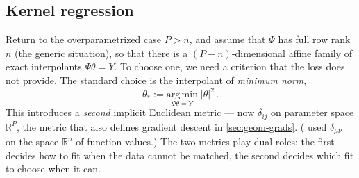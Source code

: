 \documentclass[11pt]{article}
\newcommand{\R}{\mathbb{R}}
\begin{document}
\subsection{Kernel regression}
\label{app:kernel}

Return to the overparametrized case $P>n$, and assume that $\Psi$ has full row rank $n$ (the generic situation), so that there is a $(P-n)$-dimensional affine family of exact interpolants $\Psi\theta = Y$. To choose one, we need a criterion that the loss does not provide. The standard choice is the interpolant of \emph{minimum norm},
%
\begin{equation}
    \theta_* := \underset{\Psi\theta = Y}{\mathrm{arg\,min}}\; |\theta|^2\,. \label{app-minnorm}
\end{equation}
%
This introduces a \emph{second} implicit Euclidean metric --- now $\delta_{ij}$ on parameter space $\R^P$, the metric that also defines gradient descent in \cref{sec:geom-grads}. ( used $\delta_{\mu\nu}$ on the space $\R^n$ of function values.) The two metrics play dual roles: the first decides how to fit when the data cannot be matched, the second decides which fit to choose when it can.
\end{document}
